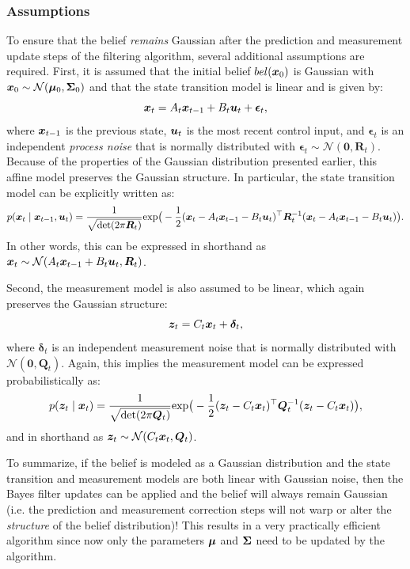 \subsubsection{Assumptions}
To ensure that the belief \textit{remains} Gaussian after the prediction and measurement update steps of the filtering algorithm, several additional assumptions are required.
First, it is assumed that the initial belief $bel(\bm{x}_0)$ is Gaussian with $\bm{x}_0 \sim \mathcal{N}(\bm{\mu}_0, \bm{\Sigma}_0)$ and that the state transition model is linear and is given by:
\begin{equation} \label{eq:KFdynamics}
    \bm{x}_t = A_t \bm{x}_{t-1} + B_t \bm{u}_t + \bm{\epsilon}_t,
\end{equation}
where $\bm{x}_{t-1}$ is the previous state, $\bm{u}_t$ is the most recent control input, and $\bm{\epsilon}_{t}$ is an independent \textit{process noise} that is normally distributed with $\bm{\epsilon}_t \sim \mathcal{N}(\bm{0},\bm{R}_t)$.
Because of the properties of the Gaussian distribution presented earlier, this affine model preserves the Gaussian structure. In particular, the state transition model can be explicitly written as:
\begin{equation*}
p(\bm{x}_t \mid \bm{x}_{t-1}, \bm{u}_t) = \frac{1}{\sqrt{\text{det}(2\pi \bm{R}_t)}} \text{exp}\big( -\frac{1}{2}(\bm{x}_t-A_t \bm{x}_{t-1} - B_t \bm{u}_t)^\top  \bm{R}_t^{-1} (\bm{x}_t-A_t \bm{x}_{t-1} - B_t \bm{u}_t) \big).
\end{equation*}
In other words, this can be expressed in shorthand as $\bm{x}_t \sim \mathcal{N}(A_t \bm{x}_{t-1} + B_t \bm{u}_t, \bm{R}_t)$.

Second, the measurement model is also assumed to be linear, which again preserves the Gaussian structure:
\begin{equation} \label{eq:measure}
\bm{z}_t = C_t \bm{x}_t + \bm{\delta}_t,
\end{equation}
where $\bm{\delta}_t$ is an independent measurement noise that is normally distributed with $\mathcal{N}(\bm{0},\bm{Q}_t)$.
Again, this implies the measurement model can be expressed probabilistically as:
\begin{equation*}
p(\bm{z}_t \mid \bm{x}_t) = \frac{1}{\sqrt{\text{det}(2\pi \bm{Q}_t)}} \text{exp}\big( -\frac{1}{2}(\bm{z}_t-C_t\bm{x}_t)^\top  \bm{Q}_t^{-1} (\bm{z}_t-C_t\bm{x}_t) \big),
\end{equation*}
and in shorthand as $\bm{z}_t \sim \mathcal{N}(C_t \bm{x}_{t}, \bm{Q}_t)$.

To summarize, if the belief is modeled as a Gaussian distribution and the state transition and measurement models are both linear with Gaussian noise, then the Bayes filter updates can be applied and the belief will always remain Gaussian (i.e. the prediction and measurement correction steps will not warp or alter the \textit{structure} of the belief distribution)! This results in a very practically efficient algorithm since now only the parameters $\bm{\mu}$ and $\bm{\Sigma}$ need to be updated by the algorithm.


